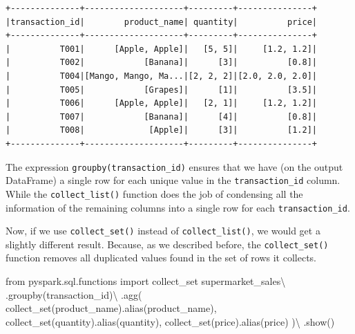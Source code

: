 \documentclass[
  11pt,
  letterpaper,
  DIV=11,
  numbers=noendperiod]{scrreprt}
\newenvironment{Shaded}{\begin{snugshade}}{\end{snugshade}}
\newcommand{\ImportTok}[1]{\textcolor[rgb]{0.00,0.46,0.62}{#1}}
\newcommand{\NormalTok}[1]{\textcolor[rgb]{0.00,0.23,0.31}{#1}}
\newcommand{\OperatorTok}[1]{\textcolor[rgb]{0.37,0.37,0.37}{#1}}
\newcommand{\StringTok}[1]{\textcolor[rgb]{0.13,0.47,0.30}{#1}}
\begin{document}
\begin{verbatim}
+--------------+--------------------+---------+---------------+
|transaction_id|        product_name| quantity|          price|
+--------------+--------------------+---------+---------------+
|          T001|      [Apple, Apple]|   [5, 5]|     [1.2, 1.2]|
|          T002|            [Banana]|      [3]|          [0.8]|
|          T004|[Mango, Mango, Ma...|[2, 2, 2]|[2.0, 2.0, 2.0]|
|          T005|            [Grapes]|      [1]|          [3.5]|
|          T006|      [Apple, Apple]|   [2, 1]|     [1.2, 1.2]|
|          T007|            [Banana]|      [4]|          [0.8]|
|          T008|             [Apple]|      [3]|          [1.2]|
+--------------+--------------------+---------+---------------+
\end{verbatim}

The expression
\texttt{groupby(\textquotesingle{}transaction\_id\textquotesingle{})}
ensures that we have (on the output DataFrame) a single row for each
unique value in the \texttt{transaction\_id} column. While the
\texttt{collect\_list()} function does the job of condensing all the
information of the remaining columns into a single row for each
\texttt{transaction\_id}.

Now, if we use \texttt{collect\_set()} instead of
\texttt{collect\_list()}, we would get a slightly different result.
Because, as we described before, the \texttt{collect\_set()} function
removes all duplicated values found in the set of rows it collects.

\begin{Shaded}
\begin{Highlighting}[]
\ImportTok{from}\NormalTok{ pyspark.sql.functions }\ImportTok{import}\NormalTok{ collect\_set}
\NormalTok{supermarket\_sales}\OperatorTok{\textbackslash{}}
\NormalTok{    .groupby(}\StringTok{\textquotesingle{}transaction\_id\textquotesingle{}}\NormalTok{)}\OperatorTok{\textbackslash{}}
\NormalTok{    .agg(}
\NormalTok{        collect\_set(}\StringTok{\textquotesingle{}product\_name\textquotesingle{}}\NormalTok{).alias(}\StringTok{\textquotesingle{}product\_name\textquotesingle{}}\NormalTok{),}
\NormalTok{        collect\_set(}\StringTok{\textquotesingle{}quantity\textquotesingle{}}\NormalTok{).alias(}\StringTok{\textquotesingle{}quantity\textquotesingle{}}\NormalTok{),}
\NormalTok{        collect\_set(}\StringTok{\textquotesingle{}price\textquotesingle{}}\NormalTok{).alias(}\StringTok{\textquotesingle{}price\textquotesingle{}}\NormalTok{)}
\NormalTok{    )}\OperatorTok{\textbackslash{}}
\NormalTok{    .show()}
\end{Highlighting}
\end{Shaded}
\end{document}
